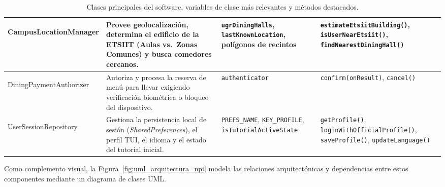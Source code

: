 \documentclass[11pt,a4paper]{article}
\begin{document}
\begin{table}[H]
\begin{tabularx}{\textwidth}{>{\bfseries\raggedright\arraybackslash}p{3.4cm} >{\raggedright\arraybackslash}p{4.1cm} >{\raggedright\arraybackslash}p{3.4cm} >{\raggedright\arraybackslash}X}
\midrule
CampusLocation\allowbreak Manager & Provee geolocalización, determina el edificio de la ETSIIT (Aulas vs.\ Zonas Comunes) y busca comedores cercanos. & \texttt{ugrDiningHalls}, \newline \texttt{lastKnownLocation}, polígonos de recintos & \texttt{estimateEtsiit\allowbreak Building()}, \newline \texttt{isUserNearEtsiit()}, \newline \texttt{findNearest\allowbreak DiningHall()} \\
\midrule
DiningPayment\allowbreak Authorizer & Autoriza y procesa la reserva de menú para llevar exigiendo verificación biométrica o bloqueo del dispositivo. & \texttt{authenticator} & \texttt{confirm(onResult)}, \newline \texttt{cancel()} \\
\midrule
UserSession\allowbreak Repository & Gestiona la persistencia local de sesión (\textit{SharedPreferences}), el perfil TUI, el idioma y el estado del tutorial inicial. & \texttt{PREFS\_NAME}, \texttt{KEY\_PROFILE}, \newline \texttt{isTutorial\allowbreak ActiveState} & \texttt{getProfile()}, \newline \texttt{loginWithOfficial\allowbreak Profile()}, \newline \texttt{saveProfile()}, \newline \texttt{updateLanguage()} \\
\bottomrule
\end{tabularx}
\caption{Clases principales del software, variables de clase más relevantes y métodos destacados.}
\label{tab:clases}
\end{table}

Como complemento visual, la Figura~\ref{fig:uml_arquitectura_npi} modela las relaciones arquitectónicas y dependencias entre estos componentes mediante un diagrama de clases UML.
\end{document}
